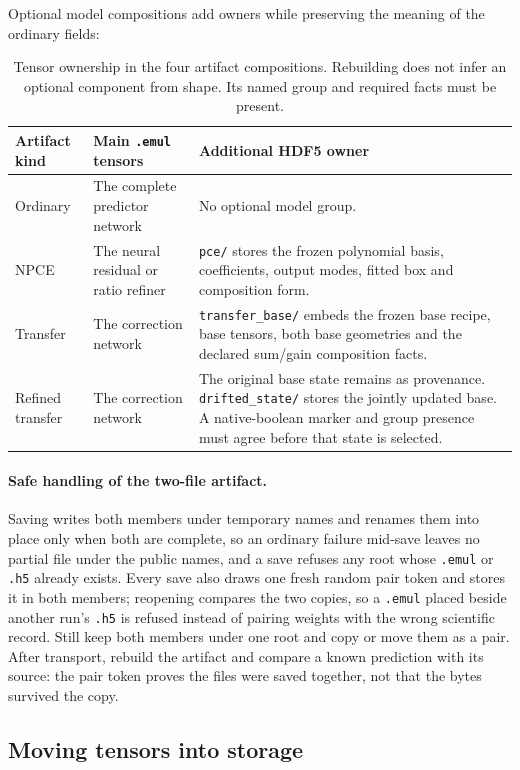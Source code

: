 \documentclass[10pt,aps,prd,twocolumn,nofootinbib]{revtex4-2}
\newcommand{\code}[1]{\texttt{#1}}
\begin{document}
Optional model compositions add owners while preserving the meaning of the
ordinary fields:
\begin{table}[t]
\centering
\begin{tabular}{p{}p{}p{}}
\toprule
Artifact kind & Main \code{.emul} tensors & Additional HDF5 owner \\
\midrule
Ordinary & The complete predictor network & No optional model group.  \\
NPCE & The neural residual or ratio refiner & \code{pce/} stores the frozen
polynomial basis, coefficients, output modes, fitted box and composition
form.  \\
Transfer & The correction network & \code{transfer\_base/} embeds the frozen
base recipe, base tensors, both base geometries and the declared sum/gain
composition facts.  \\
Refined transfer & The correction network & The original base state remains
as provenance.  \code{drifted\_state/} stores the jointly updated base.  A
native-boolean marker and group presence must agree before that state is
selected.  \\
\bottomrule
\end{tabular}
\caption{Tensor ownership in the four artifact compositions.  Rebuilding
does not infer an optional component from shape.  Its named group and required
facts must be present.}
\end{table}

\paragraph{Safe handling of the two-file artifact.}
Saving writes both members under temporary names and renames them into place
only when both are complete, so an ordinary failure mid-save leaves no
partial file under the public names, and a save refuses any root whose
\code{.emul} or \code{.h5} already exists.  Every save also draws one fresh
random pair token and stores it in both members; reopening compares the two
copies, so a \code{.emul} placed beside another run's \code{.h5} is refused
instead of pairing weights with the wrong scientific record.  Still keep both
members under one root and copy or move them as a pair.  After transport,
rebuild the artifact and compare a known prediction with its source: the pair
token proves the files were saved together, not that the bytes survived the
copy.

\subsection{Moving tensors into storage}
\end{document}
